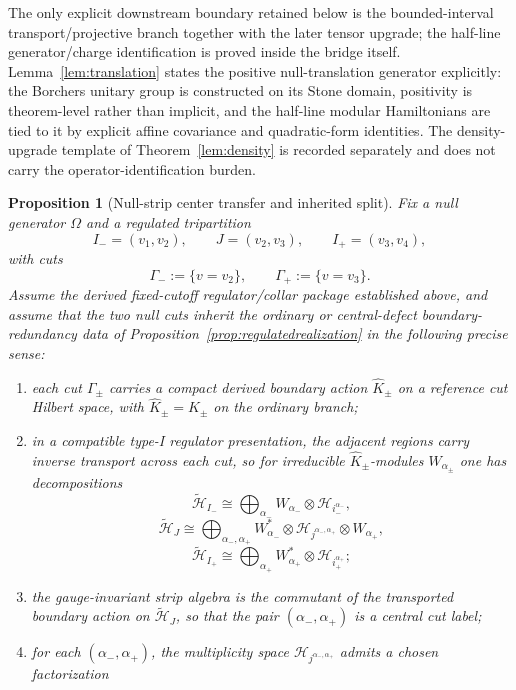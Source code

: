 \documentclass[11pt]{article}
\newtheorem{proposition}[theorem]{Proposition}
\begin{document}
The only explicit downstream boundary retained below is the bounded-interval transport/projective branch together with the later tensor upgrade; the half-line generator/charge identification is proved inside the bridge itself. Lemma~\ref{lem:translation} states the positive null-translation generator explicitly: the Borchers unitary group is constructed on its Stone domain, positivity is theorem-level rather than implicit, and the half-line modular Hamiltonians are tied to it by explicit affine covariance and quadratic-form identities. The density-upgrade template of Theorem~\ref{lem:density} is recorded separately and does not carry the operator-identification burden.

\begin{proposition}[Null-strip center transfer and inherited split]\label{prop:nullec}
Fix a null generator \(\Omega\) and a regulated tripartition
\[
I_-=(v_1,v_2),\qquad
J=(v_2,v_3),\qquad
I_+=(v_3,v_4),
\]
with cuts
\[
\Gamma_-:=\{v=v_2\},
\qquad
\Gamma_+:=\{v=v_3\}.
\]
Assume the derived fixed-cutoff regulator/collar package established above, and assume that the two null cuts inherit the ordinary or central-defect boundary-redundancy data of Proposition~\ref{prop:regulatedrealization} in the following precise sense:
\begin{enumerate}[leftmargin=2em,label=(\roman*)]
\item each cut \(\Gamma_\pm\) carries a compact derived boundary action \(\widehat K_\pm\) on a reference cut Hilbert space, with \(\widehat K_\pm=K_\pm\) on the ordinary branch;
\item in a compatible type-I regulator presentation, the adjacent regions carry inverse transport across each cut, so for irreducible \(\widehat K_\pm\)-modules \(W_{\alpha_\pm}\) one has decompositions
\[
\tilde{\mathcal H}_{I_-}
\cong
\bigoplus_{\alpha_-}
W_{\alpha_-}\otimes \mathcal H_{i_-^{\alpha_-}},
\]
\[
\tilde{\mathcal H}_{J}
\cong
\bigoplus_{\alpha_-,\alpha_+}
W_{\alpha_-}^{*}\otimes
\mathcal H_{j^{\alpha_-,\alpha_+}}\otimes
W_{\alpha_+},
\]
\[
\tilde{\mathcal H}_{I_+}
\cong
\bigoplus_{\alpha_+}
W_{\alpha_+}^{*}\otimes \mathcal H_{i_+^{\alpha_+}};
\]
\item the gauge-invariant strip algebra is the commutant of the transported boundary action on \(\tilde{\mathcal H}_J\), so that the pair \((\alpha_-,\alpha_+)\) is a central cut label;
\item for each \((\alpha_-,\alpha_+)\), the multiplicity space \(\mathcal H_{j^{\alpha_-,\alpha_+}}\) admits a chosen factorization
\[
\]
\end{enumerate}
\end{proposition}
\end{document}
